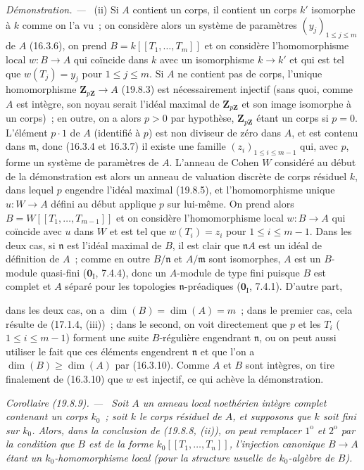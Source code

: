 \documentclass[10pt,oneside]{book}
\makeatletter
\newcommand{\setmanualcurrentlabel}[1]{\def\@currentlabel{#1}}
\newcommand{\oldpage}[2][]{%
  \setcounter{footnote}{0}%
  \marginpar{\scriptsize\textbf{#1}~|~#2}\ignorespaces}
\newenvironment{corollary}[1][]{%
  \setmanualcurrentlabel{#1}\par\medskip\noindent\itshape Corollaire (#1). ---\ }{\par}
\newenvironment{proof}{%
  \par\medskip\noindent\textit{Démonstration. ---\ }}{\par}
\makeatother
\begin{document}
\begin{proof}
\medskip
\noindent(ii)\enspace
Si $A$ contient un corps, il contient un corps $k'$ isomorphe à $k$ comme on
l'a vu~; on considère alors un système de paramètres
$(y_j)_{1\leq j\leq m}$ de $A$ (16.3.6), on prend
$B=k[[T_1,\ldots,T_m]]$ et on considère l'homomorphisme local $w:B\to A$ qui
coïncide dans $k$ avec un isomorphisme $k\to k'$ et qui est tel que
$w(T_j)=y_j$ pour $1\leq j\leq m$. Si $A$ ne contient pas de corps, l'unique
homomorphisme $\mathbf Z_{p\mathbf Z}\to A$ (19.8.3) est nécessairement
injectif (sans quoi, comme $A$ est intègre, son noyau serait l'idéal maximal de
$\mathbf Z_{p\mathbf Z}$ et son image isomorphe à un corps)~; en outre, on a
alors $p>0$ par hypothèse, $\mathbf Z_{p\mathbf Z}$ étant un corps si $p=0$.
L'élément $p\cdot1$ de $A$ (identifié à $p$) est non diviseur de zéro dans $A$,
et est contenu dans $\mathfrak m$, donc (16.3.4 et 16.3.7) il existe une famille
$(z_i)_{1\leq i\leq m-1}$ qui, avec $p$, forme un système de paramètres de $A$.
L'anneau de Cohen $W$ considéré au début de la démonstration est alors un
anneau de valuation discrète de corps résiduel $k$, dans lequel $p$ engendre
l'idéal maximal (19.8.5), et l'homomorphisme unique $u:W\to A$ défini au début
applique $p$ sur lui-même. On prend alors $B=W[[T_1,\ldots,T_{m-1}]]$ et on
considère l'homomorphisme local $w:B\to A$ qui coïncide avec $u$ dans $W$ et
est tel que $w(T_i)=z_i$ pour $1\leq i\leq m-1$. Dans les deux cas, si
$\mathfrak n$ est l'idéal maximal de $B$, il est clair que $\mathfrak nA$ est
un idéal de définition de $A$~; comme en outre $B/\mathfrak n$ et
$A/\mathfrak m$ sont isomorphes, $A$ est un $B$-module quasi-fini
($\mathbf 0_{\mathrm I}$, 7.4.4), donc un $A$-module de type fini puisque $B$
est complet et $A$ séparé pour les topologies $\mathfrak n$-préadiques
($\mathbf 0_{\mathrm I}$, 7.4.1). D'autre part,

\oldpage[0\textsubscript{IV-1}]{113}

dans les deux cas, on a $\dim(B)=\dim(A)=m$~; dans le premier cas, cela résulte
de (17.1.4, (iii))~; dans le second, on voit directement que $p$ et les $T_i$
($1\leq i\leq m-1$) forment une suite $B$-régulière engendrant $\mathfrak n$,
ou on peut aussi utiliser le fait que ces éléments engendrent $\mathfrak n$ et
que l'on a $\dim(B)\geq\dim(A)$ par (16.3.10). Comme $A$ et $B$ sont intègres,
on tire finalement de (16.3.10) que $w$ est injectif, ce qui achève la
démonstration.
\end{proof}

\begin{corollary}[19.8.9]
\label{0.19.8.9-fr}
Soit $A$ un anneau local noethérien intègre complet contenant un corps $k_0$~;
soit $k$ le corps résiduel de $A$, et supposons que $k$ soit fini sur $k_0$.
Alors, dans la conclusion de (19.8.8, (ii)), on peut remplacer $1^{\mathrm o}$
et $2^{\mathrm o}$ par la condition que $B$ est de la forme
$k_0[[T_1,\ldots,T_n]]$, l'injection canonique $B\to A$ étant un
$k_0$-homomorphisme local (pour la structure usuelle de $k_0$-algèbre de $B$).
\end{corollary}
\end{document}
